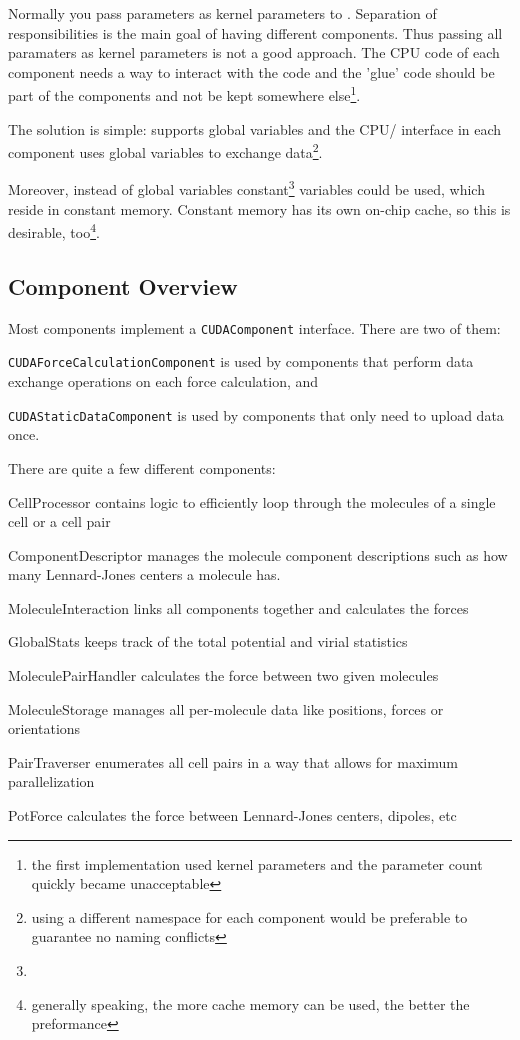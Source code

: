 Normally you pass parameters as kernel parameters to \cuda{}. Separation of responsibilities is the main goal of having different components. Thus passing all paramaters as kernel parameters is not a good approach. The CPU code of each component needs a way to interact with the \cuda{} code and the 'glue' code should be part of the components and not be kept somewhere else\footnote{the first implementation used kernel parameters and the parameter count quickly became unacceptable}.

The solution is simple: \cuda{} supports global variables and the CPU/\cuda{} interface in each component uses global variables to exchange data\footnote{using a different namespace for each component would be preferable to guarantee no naming conflicts}.

Moreover, instead of global variables constant\footnote{} variables could be used, which reside in constant memory. Constant memory has its own on-chip cache, so this is desirable, too\footnote{generally speaking, the more cache memory can be used, the better the preformance}.


\subsection{Component Overview}
Most components implement a \lstinline!CUDAComponent! interface. There are two of them:
\begin{compactitem}
\item \lstinline!CUDAForceCalculationComponent! is used by components that perform data exchange operations on each force calculation, and
\item \lstinline!CUDAStaticDataComponent! is used by components that only need to upload data once.
\end{compactitem}

There are quite a few different components:
\begin{compactdesc}
\item[CellProcessor] contains logic to efficiently loop through the molecules of a single cell or a cell pair
\item[ComponentDescriptor] manages the molecule component descriptions such as how many Lennard-Jones centers a molecule has.
\item[MoleculeInteraction] links all components together and calculates the forces
\item[GlobalStats] keeps track of the total potential and virial statistics
\item[MoleculePairHandler] calculates the force between two given molecules
\item[MoleculeStorage] manages all per-molecule data like positions, forces or orientations
\item[PairTraverser] enumerates all cell pairs in a way that allows for maximum parallelization
\item[PotForce] calculates the force between Lennard-Jones centers, dipoles, etc
\end{compactdesc}

